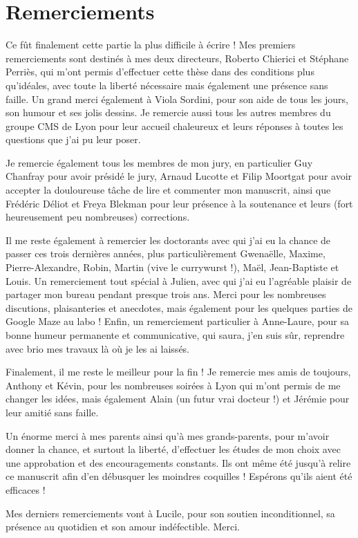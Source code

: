 
\begingroup
\let\clearpage\relax
\let\cleardoublepage\relax
\let\cleardoublepage\relax
\chapter*{Remerciements}

Ce fût finalement cette partie la plus difficile à écrire ! Mes premiers remerciements sont destinés à mes deux directeurs, Roberto Chierici et Stéphane Perriès, qui m'ont permis d'effectuer cette thèse dans des conditions plus qu'idéales, avec toute la liberté nécessaire mais également une présence sans faille. Un grand merci également à Viola Sordini, pour son aide de tous les jours, son humour et ses jolis dessins. Je remercie aussi tous les autres membres du groupe CMS de Lyon pour leur accueil chaleureux et leurs réponses à toutes les questions que j'ai pu leur poser.

\bigskip

Je remercie également tous les membres de mon jury, en particulier Guy Chanfray pour avoir présidé le jury, Arnaud Lucotte et Filip Moortgat pour avoir accepter la douloureuse tâche de lire et commenter mon manuscrit, ainsi que Frédéric Déliot et Freya Blekman pour leur présence à la soutenance et leurs (fort heureusement peu nombreuses) corrections.

\bigskip

Il me reste également à remercier les doctorants avec qui j'ai eu la chance de passer ces trois dernières années, plus particulièrement Gwenaëlle, Maxime, Pierre-Alexandre, Robin, Martin (vive le currywurst !), Maël, Jean-Baptiste et Louis. Un remerciement tout spécial à Julien, avec qui j'ai eu l'agréable plaisir de partager mon bureau pendant presque trois ans. Merci pour les nombreuses discutions, plaisanteries et anecdotes, mais également pour les quelques parties de Google Maze au labo ! Enfin, un remerciement particulier à Anne-Laure, pour sa bonne humeur permanente et communicative, qui saura, j'en suis sûr, reprendre avec brio mes travaux là où je les ai laissés.

\bigskip

Finalement, il me reste le meilleur pour la fin ! Je remercie mes amis de toujours, Anthony et Kévin, pour les nombreuses soirées à Lyon qui m'ont permis de me changer les idées, mais également Alain (un futur vrai docteur !) et Jérémie pour leur amitié sans faille.

\bigskip

Un énorme merci à mes parents ainsi qu'à mes grands-parents, pour m'avoir donner la chance, et surtout la liberté, d'effectuer les études de mon choix avec une approbation et des encouragements constants. Ils ont même été jusqu'à relire ce manuscrit afin d'en débusquer les moindres coquilles ! Espérons qu'ils aient été efficaces !

\medskip

Mes derniers remerciements vont à Lucile, pour son soutien inconditionnel, sa présence au quotidien et son amour indéfectible. Merci.

\endgroup